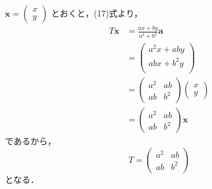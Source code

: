 \documentclass[uplatex,dvipdfmx,a4paper,10pt,fleqn]{jsarticle}
\begin{document}
\begin{tleftbar}
$\bm{x} =
\begin{pmatrix}
x \\
y
\end{pmatrix}
$
とおくと，(17)式より，
\begin{align*}
T \bm{x} &= \frac{ax+by}{a^2+b^2} \bm{a} \\
&=
\begin{pmatrix}
a^2x +aby \\
ab x + b^2y \\
\end{pmatrix}
\\
&=
\begin{pmatrix}
a^2 & ab \\
ab & b^2
\end{pmatrix}
\begin{pmatrix}
x \\
y
\end{pmatrix}
 \\
&= 
\begin{pmatrix}
a^2 & ab \\
ab & b^2
\end{pmatrix}
\bm{x}
\end{align*}
であるから，
\[
T=\begin{pmatrix}
a^2 & ab \\
ab & b^2
\end{pmatrix}
\]
となる．
\end{tleftbar}
%
\newpage
\end{document}
